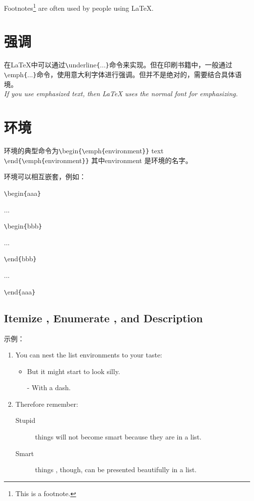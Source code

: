 \documentclass[UTF8]{ctexart}
\begin{document}
Footnotes\footnote{This is a footnote.} are often used by people using \LaTeX.
\section{强调}
在\LaTeX 中可以通过\texttt{\textbackslash}underline\texttt{\{}...\texttt{\}}命令来实现。但在印刷书籍中，一般通过
\texttt{\textbackslash}emph\texttt{\{}...\texttt{\}}命令，使用意大利字体进行强调。但并不是绝对的，需要结合具体语境。
\\

\emph{If you use emphasized text, then \LaTeX{} uses the \emph{normal} font for emphasizing.}
\section{环境}
环境的典型命令为\texttt{\textbackslash}begin\texttt{\{}\texttt{\textbackslash}emph\texttt{\{}environment\texttt{\}}\texttt{\}}
 text \texttt{\textbackslash}end\texttt{\{}\texttt{\textbackslash}emph\texttt{\{}environment\texttt{\}}\texttt{\}} 其中environment
是环境的名字。

环境可以相互嵌套，例如：

\texttt{\textbackslash}begin\texttt{\{}aaa\texttt{\}}

   \qquad ...

    \qquad  \texttt{\textbackslash}begin\texttt{\{}bbb\texttt{\}}

      \qquad \qquad  ...

    \qquad  \texttt{\textbackslash}end\texttt{\{}bbb\texttt{\}}

   \qquad ...

\texttt{\textbackslash}end\texttt{\{}aaa\texttt{\}}

\subsection{Itemize , Enumerate , and Description}
示例：
\flushleft
\begin{enumerate}
\item You can nest the list environments to your taste:
\begin{itemize}
\item But it might start to look silly.
\item[-] With a dash.
\end{itemize}
\item Therefore remember:
\begin{description}
\item[Stupid] things will not become smart because they are in a list.
\item[Smart] things , though, can be presented beautifully in a list.
\end{description}
\end{enumerate}
\end{document}
